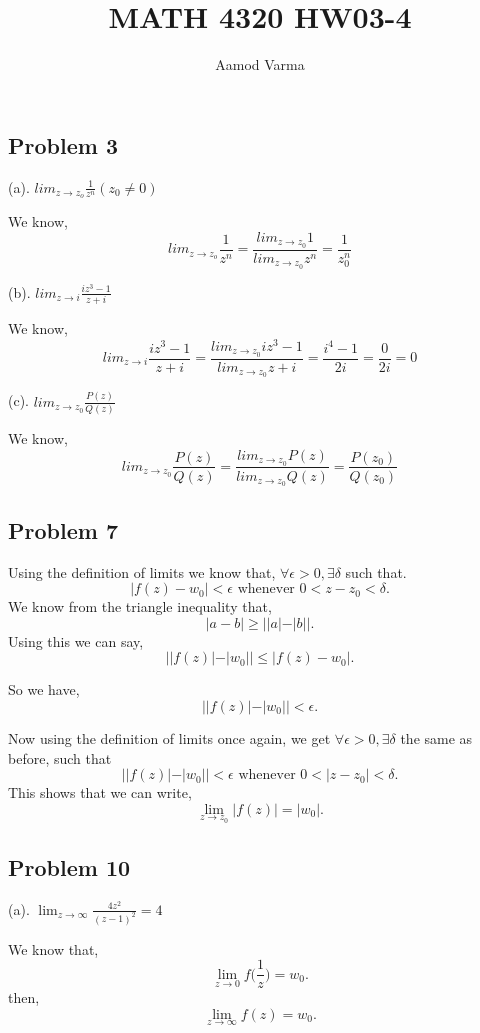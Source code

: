 \documentclass[a4paper]{report}
\title{MATH 4320 HW03-4}
\author{Aamod Varma}
\begin{document}
\maketitle


\subsection*{Problem 3}
(a). $lim_{z \rightarrow z_o} \frac{1}{z^n}(z_0 \neq 0)$

We know, $$lim_{z \rightarrow z_o} \frac{1}{z^n} = \frac{lim_{z \rightarrow z_0}1} {lim_{z \rightarrow z_0}{z^n}} = \frac{1}{z_0^n}$$

(b). $lim_{z \rightarrow i} \frac{iz^3 - 1}{z + i}$


We know, $$lim_{z \rightarrow i} \frac{iz^3 - 1}{z + i} = \frac{lim_{z \rightarrow z_0}iz^3 - 1} {lim_{z \rightarrow z_0}{z + i}} = \frac{i^4 - 1}{2i} = \frac{0}{2i} = 0$$


(c). $lim_{z \rightarrow z_0} \frac{P(z)}{Q(z)}$

We know, $$lim_{z \rightarrow z_0} \frac{P(z)}{Q(z)} = \frac{lim_{z \rightarrow z_0}P(z)} {lim_{z \rightarrow z_0}{Q(z)}} = \frac{P(z_0)}{Q(z_0)}$$




\subsection*{Problem 7}
Using the definition of limits we know that, $\forall \epsilon > 0, \exists \delta$ such that. \[
    |f(z) - w_0| < \epsilon \text{ whenever } 0 < z - z_0 < \delta
.\] 
We know from the triangle inequality that, \[
|a - b| \ge ||a| - |b||
.\] 
Using this we can say, \[
||f(z)| - |w_0|| \le |f(z) - w_0|
.\] 

So we have, \[
||f(z)| - |w_0|| < \epsilon
.\] 

Now using the definition of limits once again, we get $\forall \epsilon > 0, \exists \delta$ the same as before, such that  \[
    ||f(z)| - |w_0|| < \epsilon \text{ whenever } 0 < |z - z_0| < \delta
.\] 
This shows that we can write, \[
\lim_{z \to z_0} |f(z)| = |w_0|
.\] 

\subsection*{Problem 10}
(a). $\lim_{z \to \infty} \frac{4z^2}{(z-1)^2} = 4$ 

We know that, \[
\lim_{z \to 0} f\bigg (\frac{1}{z}\bigg ) = w_0
.\] 
then, \[
\lim_{z \to \infty} f(z) = w_0
.\] 
\end{document}
